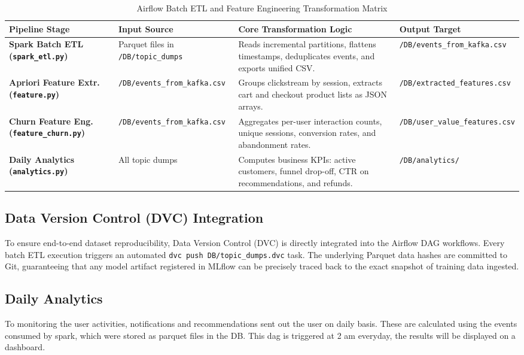 \documentclass[11pt,a4paper]{article}
\begin{document}
\begin{table}[h]
\centering
\small
\begin{tabularx}{\textwidth}{@{}>{\bfseries}p{3.5cm}p{3.2cm}p{4.2cm}X@{}}
\toprule
\color{DeepNavy}Pipeline Stage & \color{DeepNavy}Input Source & \color{DeepNavy}Core Transformation Logic & \color{DeepNavy}Output Target \\
\midrule
Spark Batch ETL \newline (\texttt{spark\_etl.py}) & Parquet files in \newline \texttt{/DB/topic\_dumps} & Reads incremental partitions, flattens timestamps, deduplicates events, and exports unified CSV. & \texttt{/DB/events\_from\_kafka.csv} \\
\addlinespace
Apriori Feature Extr. \newline (\texttt{feature.py}) & \texttt{/DB/events\_from\_kafka.csv} & Groups clickstream by session, extracts cart and checkout product lists as JSON arrays. & \texttt{/DB/extracted\_features.csv} \\
\addlinespace
Churn Feature Eng. \newline (\texttt{feature\_churn.py}) & \texttt{/DB/events\_from\_kafka.csv} & Aggregates per-user interaction counts, unique sessions, conversion rates, and abandonment rates. & \texttt{/DB/user\_value\_features.csv} \\
\addlinespace
Daily Analytics \newline (\texttt{analytics.py}) & All topic dumps & Computes business KPIs: active customers, funnel drop-off, CTR on recommendations, and refunds. & \texttt{/DB/analytics/} \\
\bottomrule
\end{tabularx}
\caption{Airflow Batch ETL and Feature Engineering Transformation Matrix}
\end{table}

\subsection{Data Version Control (DVC) Integration}
To ensure end-to-end dataset reproducibility, Data Version Control (DVC) is directly integrated into the Airflow DAG workflows. Every batch ETL execution triggers an automated \texttt{dvc push DB/topic\_dumps.dvc} task. The underlying Parquet data hashes are committed to Git, guaranteeing that any model artifact registered in MLflow can be precisely traced back to the exact snapshot of training data ingested.

\subsection{Daily Analytics}
To monitoring the user activities, notifications and recommendations sent out the user on daily basis. These are calculated using the events consumed by spark, which were stored as parquet files in the DB. This dag is triggered at 2 am everyday, the results will be displayed on a dashboard.
\end{document}
